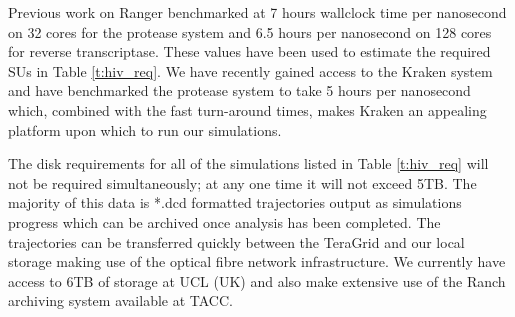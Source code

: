 \begin{compactenum}[a)]
Previous work on Ranger benchmarked at 7 hours wallclock time per nanosecond on 32 cores for the protease system and 6.5 hours per nanosecond on 128 cores for reverse transcriptase. These values have been used to estimate the required SUs in Table \ref{t:hiv_req}. We have recently gained access to the Kraken system and have benchmarked the protease system to take 5 hours per nanosecond which, combined with the fast turn-around times, makes Kraken an appealing platform upon which to run our simulations.

The disk requirements for all of the simulations listed in Table \ref{t:hiv_req} will not be required simultaneously; at any
one time it will not exceed 5TB. The majority of this data is *.dcd formatted trajectories output as simulations progress which can be archived once analysis has been completed. The trajectories can be transferred quickly between the TeraGrid and our local storage making use of the optical fibre network infrastructure. We currently have access to 6TB of storage at UCL (UK) and also make extensive use of the Ranch archiving system available at TACC.


\end{compactenum}
